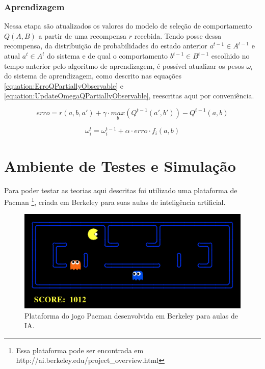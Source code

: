 \subsubsection{Aprendizagem}

Nessa etapa são atualizados os valores do modelo de seleção de comportamento $ Q \left( A, B \right) $ a partir de uma recompensa $ r $ recebida. Tendo posse dessa recompensa, da distribuição de probabilidades do estado anterior $ a^{t-1} \in A^{t-1} $ e atual $ a^t \in A^t $ do sistema e de qual o comportamento $ b^{t-1} \in B^{t-1} $ escolhido no tempo anterior pelo algoritmo de aprendizagem, é possível atualizar os pesos $ \omega_i $ do sistema de aprendizagem, como descrito nas equações \ref{equation:ErroQPartiallyObservable} e \ref{equation:UpdateOmegaQPartiallyObservable}, reescritas aqui por conveniência.

$$
	erro = r \left( a, b, a' \right) + \gamma \cdot \underset{b}{max} \left( Q^{t-1} \left( a', b' \right) \right) - Q^{t-1} \left( a, b \right)
$$

$$
	\omega_i^t = \omega_i^{t-1} + \alpha \cdot erro \cdot f_i \left( a, b \right)
$$



\section{Ambiente de Testes e Simulação} \label{section:AmbienteDeTestes}

Para poder testar as teorias aqui descritas foi utilizado uma plataforma de Pacman%
\footnote{Essa plataforma pode ser encontrada em http://ai.berkeley.edu/project\_overview.html%
}, criada em Berkeley para suas aulas de inteligência artificial.

\begin{figure}[h]
    \centering
    \includegraphics[width=120mm]{images/pacman_platform}
    \caption{\label{img:PlataformaSimulacaoPacman}Plataforma do jogo Pacman desenvolvida em Berkeley para aulas de IA.}
\end{figure}

